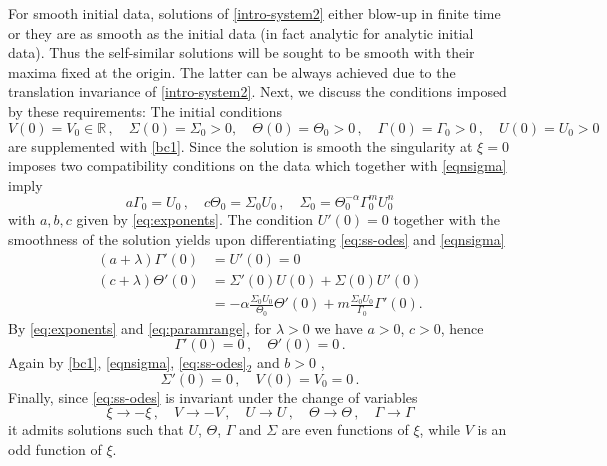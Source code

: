 \documentclass[11pt]{article}
\newcommand{\tcb}{}
\theoremstyle{remark}
\begin{document}
{For smooth initial data,  solutions of  \eqref{intro-system2} either blow-up in finite time
or they are as smooth as the initial data  \cite[Theorem 1]{Tz_1987} (in fact analytic for analytic initial data).
Thus the self-similar solutions will be sought to be smooth with their maxima fixed at the origin. The latter can be always achieved
due to the translation invariance of  \eqref{intro-system2}.
Next, we discuss the conditions imposed by these requirements:
The  initial conditions
\begin{equation}
\label{eq:ic0}
V(0) = V_0 \in \mathbb{R} \, , \quad  \Sigma (0) = \Sigma_0 >0 ,  \quad \Theta (0) = \Theta_0>0 \, , \quad \Gamma (0) = \Gamma_0>0 \, , \quad U(0) = U_0>0
\end{equation}
are supplemented with \eqref{bc1}.
Since the solution is smooth the
singularity at $\xi = 0$ imposes two compatibility conditions on
the data which together with \eqref{eqnsigma} imply
\begin{equation}
\label{compatibility}
a \Gamma_0 = U_0 \, , \quad
c \Theta_0 = \Sigma_0 U_0 \, , \quad \Sigma_0 = \Theta_0^{-\alpha} \Gamma_0^m U_0^n
\end{equation}
with $a,b, c$ given by \eqref{eq:exponents}. The condition $U'(0) = 0$ together with the smoothness of
the solution yields upon differentiating \eqref{eq:ss-odes} and \eqref{eqnsigma}
\begin{equation}
\label{algsys}
\begin{aligned}
(a + \lambda) \Gamma'(0) &= U' (0) = 0
\\
(c + \lambda) \Theta'(0) &= \Sigma'(0) U(0) + \Sigma (0) U' (0)
\\
&= -\alpha \frac{\Sigma_0 U_0}{\Theta_0} \Theta'(0) + m \frac{\Sigma_0 U_0}{\Gamma_0} \Gamma' (0).
\end{aligned}
\end{equation}
By \eqref{eq:exponents} and \eqref{eq:paramrange},  for $\lambda >0$ we have $a > 0$, $c > 0$, hence
\begin{equation}
\label{dercon1}
\Gamma' (0) = 0 \, , \quad \Theta'(0) = 0 \, .
\end{equation}
Again by \eqref{bc1},  \eqref{eqnsigma}, \eqref{eq:ss-odes}$_2$ \tcb{and $b>0$ },
\begin{equation}
\label{dercon2}
\Sigma'(0) = 0 \, , \quad V(0) = V_0 = 0 \, .
\end{equation}
Finally, since \eqref{eq:ss-odes} is invariant under the change of variables
$$
\xi \to -\xi \, , \quad V \to - V \, , \quad U \to U \, , \quad  \Theta \to \Theta \, , \quad \Gamma \to \Gamma
$$
it admits solutions such that $U$, $\Theta$, $\Gamma$ and $\Sigma$ are even functions of $\xi$, while
$V$ is an odd function of $\xi$.

}
\end{document}
